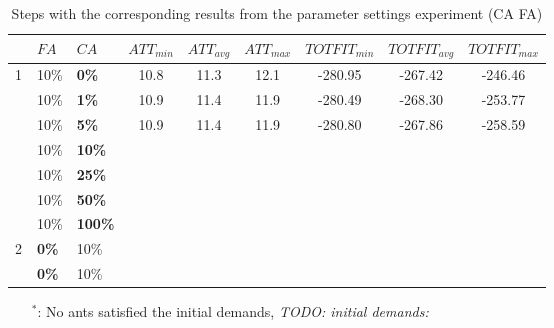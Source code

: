 \begin{sidewaystable}
    \begin{tabular}{|l|l|l||c|c|c|c|c|c|}
    \hline
    ~ & $FA$ & $CA$ & $ATT_{min}$ & $ATT_{avg}$ & $ATT_{max}$ & $TOTFIT_{min}$ & $TOTFIT_{avg}$ & $TOTFIT_{max}$\\
    \hline
    1 & 10\% & \textbf{0\%} & 10.8 & 11.3 & 12.1 & -280.95 & -267.42 & -246.46\\
    ~ & 10\% & \textbf{1\%} & 10.9 & 11.4 & 11.9 & -280.49 & -268.30 & -253.77\\
    ~ & 10\% & \textbf{5\%} & 10.9 & 11.4 & 11.9 & -280.80 & -267.86 & -258.59\\
    ~ & 10\% & \textbf{10\%} & ~ & ~ & ~ & ~ & ~ & ~\\
    ~ & 10\% & \textbf{25\%} & ~ & ~ & ~ & ~ & ~ & ~\\
    ~ & 10\% & \textbf{50\%} & ~ & ~ & ~ & ~ & ~ & ~\\
    ~ & 10\% & \textbf{100\%} & ~ & ~ & ~ & ~ & ~ & ~\\
    \hline
    2 & \textbf{0\%} & 10\% & ~ & ~ & ~ & ~ & ~ & ~\\
    ~ & \textbf{0\%} & 10\% & ~ & ~ & ~ & ~ & ~ & ~\\
    \hline
    \end{tabular}
    \caption {Steps with the corresponding results from the parameter settings experiment (CA FA)}
    \tiny
    \begin{itemize}[noitemsep]
    \item[$^*$:] No ants satisfied the initial demands, \emph{\color{blue} TODO: initial demands: }
    \end{itemize}
    \label{table:pm2}
\end{sidewaystable}



